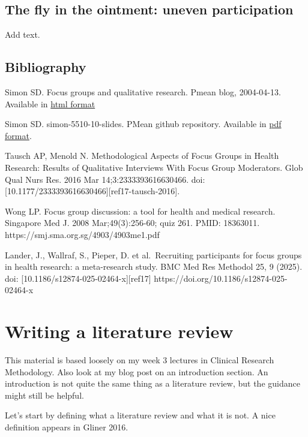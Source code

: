 \documentclass[
  letterpaper,
  DIV=11,
  numbers=noendperiod]{scrreprt}
\begin{document}
\begin{tcolorbox}
\section{The fly in the ointment: uneven
participation}\label{the-fly-in-the-ointment-uneven-participation}

Add text.

\section{Bibliography}\label{bibliography-16}

Simon SD. Focus groups and qualitative research. Pmean blog, 2004-04-13.
Available in \href{http://pmean.com/posts/focus-groups-are-great/}{html
format}

Simon SD. simon-5510-10-slides. PMean github repository. Available in
\href{https://github.com/pmean/classes/blob/master/clinical-research-methodology/10/results/simon-5510-10-slides.pdf}{pdf
format}.

Tausch AP, Menold N. Methodological Aspects of Focus Groups in Health
Research: Results of Qualitative Interviews With Focus Group Moderators.
Glob Qual Nurs Res. 2016 Mar 14;3:2333393616630466. doi:
{[}10.1177/2333393616630466{]}{[}ref17-tausch-2016{]}.

Wong LP. Focus group discussion: a tool for health and medical research.
Singapore Med J. 2008 Mar;49(3):256-60; quiz 261. PMID: 18363011.
https://smj.sma.org.sg/4903/4903me1.pdf

Lander, J., Wallraf, S., Pieper, D. et al.~Recruiting participants for
focus groups in health research: a meta-research study. BMC Med Res
Methodol 25, 9 (2025). doi: {[}10.1186/s12874-025-02464-x{]}{[}ref17{]}
https://doi.org/10.1186/s12874-025-02464-x


\chapter{Writing a literature review}\label{writing-a-literature-review}

This material is based loosely on my week 3 lectures in Clinical
Research Methodology. Also look at my blog post on an introduction
section. An introduction is not quite the same thing as a literature
review, but the guidance might still be helpful.

Let's start by defining what a literature review and what it is not. A
nice definition appears in Gliner 2016.


\end{tcolorbox}
\end{document}
